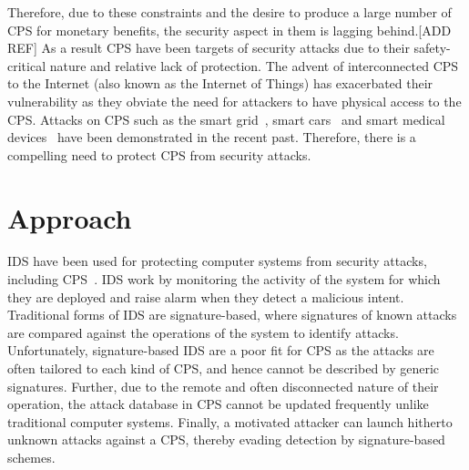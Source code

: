 Therefore, due to these constraints and the desire to produce a large number of \ac{CPS} for monetary benefits, the security aspect in them is lagging behind.[ADD REF] As a result CPS have been targets of security attacks due to their safety-critical nature and relative lack of protection. The advent of interconnected \ac{CPS} to the Internet (also known as the Internet of Things) has exacerbated their vulnerability as they obviate the need for attackers to have physical access to the \ac{CPS}. Attacks on \ac{CPS} such as the smart grid~\cite{skopik2012survey}, smart cars~\cite{checkoway2011comprehensive} and smart medical devices~\cite{leavitt2010researchers,radcliffe2011hacking} have been demonstrated in the recent past. 
Therefore, there is a compelling need to protect \ac{CPS} from security attacks. 

\section{Approach}
\label{sec:Approach}

\ac{IDS} have been used for protecting computer systems from security attacks, including CPS~\cite{lu2015towards, mitchell2015behavior, bernieri2016testbed}. \ac{IDS} work by monitoring the activity of the system for which they are deployed and raise alarm when they detect a malicious intent. Traditional forms of \ac{IDS} are signature-based, where signatures of known attacks are compared against the operations of the system to identify attacks. Unfortunately, signature-based \ac{IDS} are a poor fit for \ac{CPS} as the attacks are often tailored to each kind of \ac{CPS}, and hence cannot be described by generic signatures. Further, due to the remote and often disconnected nature of their operation, the attack database in \ac{CPS} cannot be updated frequently unlike traditional computer systems. Finally, a motivated attacker can launch hitherto unknown attacks against a \ac{CPS}, thereby evading detection by signature-based schemes. 

